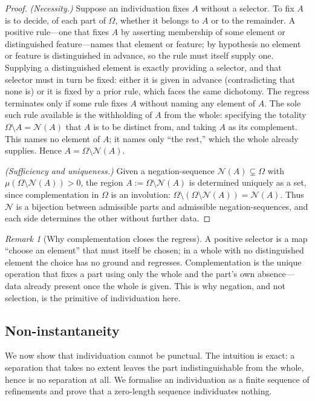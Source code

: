 \documentclass[11pt,a4paper]{article}
\theoremstyle{thmstyle}
\theoremstyle{definition}
\theoremstyle{remark}
\newtheorem{remark}[theorem]{Remark}
\newcommand{\Space}{\Omega}
\newcommand{\Neg}{\mathcal{N}}
\begin{document}
\begin{proof}
\emph{(Necessity.)} Suppose an individuation fixes $A$ without a selector. To
fix $A$ is to decide, of each part of $\Space$, whether it belongs to $A$ or to
the remainder. A positive rule---one that fixes $A$ by asserting membership of
some element or distinguished feature---names that element or feature; by
hypothesis no element or feature is distinguished in advance, so the rule must
itself supply one. Supplying a distinguished element is exactly providing a
selector, and that selector must in turn be fixed: either it is given in advance
(contradicting that none is) or it is fixed by a prior rule, which faces the same
dichotomy. The regress terminates only if some rule fixes $A$ without naming any
element of $A$. The sole such rule available is the withholding of $A$ from the
whole: specifying the totality $\Space\setminus A=\Neg(A)$ that $A$ is to be
distinct from, and taking $A$ as its complement. This names no element of $A$;
it names only ``the rest,'' which the whole already supplies. Hence
$A=\Space\setminus\Neg(A)$.

\emph{(Sufficiency and uniqueness.)} Given a negation-sequence
$\Neg(A)\subsetneq\Space$ with $\mu(\Space\setminus\Neg(A))>0$, the region
$A:=\Space\setminus\Neg(A)$ is determined uniquely as a set, since complementation
in $\Space$ is an involution: $\Space\setminus(\Space\setminus\Neg(A))=\Neg(A)$.
Thus $\Neg$ is a bijection between admissible parts and admissible
negation-sequences, and each side determines the other without further data.
\end{proof}

\begin{remark}[Why complementation closes the regress]
\label{rem:regress}
A positive selector is a map ``choose an element'' that must itself be chosen; in
a whole with no distinguished element the choice has no ground and regresses.
Complementation is the unique operation that fixes a part using only the whole
and the part's own absence---data already present once the whole is given. This
is why negation, and not selection, is the primitive of individuation here.
\end{remark}

\subsection{Non-instantaneity}

We now show that individuation cannot be punctual. The intuition is exact: a
separation that takes no extent leaves the part indistinguishable from the
whole, hence is no separation at all. We formalise an individuation as a finite
sequence of refinements and prove that a zero-length sequence individuates
nothing.
\end{document}
